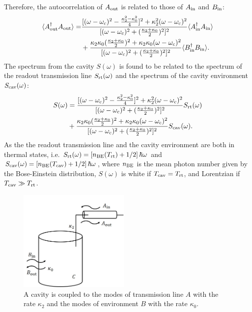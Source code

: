 
Therefore, the autocorrelation of $A_{\rm out}$ is related to those of $A_{\rm in}$ and $B_{\rm in}$:
\begin{equation}
\label{eq:autocorrelation}
\begin{split}
    \langle A_{\rm out}^\dagger A_{\rm out} \rangle  = & \frac{[(\omega-\omega_{\rm c})^2 - \frac{\kappa_2^2-\kappa_0^2}{4}]^2+\kappa_2^2(\omega-\omega_{\rm c})^2}{[(\omega-\omega_{\rm c})^2+(\frac{\kappa_2+\kappa_0}{2})^2]^2} \langle A_{\rm in}^\dagger A_{\rm in} \rangle \\ & +  \frac{\kappa_2\kappa_0(\frac{\kappa_2+\kappa_0}{2})^2+\kappa_2\kappa_0(\omega-\omega_{\rm c})^2}{[(\omega-\omega_{\rm c})^2+(\frac{\kappa_2+\kappa_0}{2})^2]^2}\langle B_{\rm in}^\dagger B_{\rm in} \rangle.
\end{split}
\end{equation}
The spectrum from the cavity $S(\omega)$ is found to be related to the spectrum 
of the readout transmission line $S_{\rm rt}(\omega)$ and the spectrum of the 
cavity environment $S_{\rm cav}(\omega)$:
\begin{equation}
\label{eq:spectrum_relation}
\begin{split}
    S(\omega) & = \frac{[(\omega-\omega_{\rm c})^2 - \frac{\kappa_2^2-\kappa_0^2}{4}]^2+\kappa_2^2(\omega-\omega_{\rm c})^2}{[(\omega-\omega_{\rm c})^2+(\frac{\kappa_2+\kappa_0}{2})^2]^2} S_{\rm rt}(\omega) \\ & + \frac{\kappa_2\kappa_0(\frac{\kappa_2+\kappa_0}{2})^2+\kappa_2\kappa_0(\omega-\omega_{\rm c})^2}{[(\omega-\omega_{\rm c})^2+(\frac{\kappa_2+\kappa_0}{2})^2]^2}S_{\rm cav}(\omega).
\end{split}
\end{equation}
As the the readout transmission line and the cavity environment are both in 
thermal states, i.e. $S_{\rm rt}(\omega)=\left[n_{\rm BE}(T_{\rm rt})+1/2\right]\hbar\omega$ 
and $S_{\rm cav}(\omega)=\left[n_{\rm BE}(T_{\rm cav})+1/2\right]\hbar\omega$, where 
$n_{\rm BE}$ is the mean photon number given by the Bose-Einstein distribution, 
$S(\omega)$ is white if $T_{\rm cav}=T_{\rm rt}$, and Lorentzian if 
$T_{\rm cav} \gg T_{\rm rt}$.

\begin{figure}[htbp]
    \centering
    \includegraphics[width=0.48\textwidth]{figures/cavity_in_out.jpg}
    \caption{A cavity is coupled to the modes of transmission line $A$ with the 
rate $\kappa_2$ and the modes of environment $B$ with the rate $\kappa_0$.}
    \label{fig:cavity_in_out.jpg}
\end{figure}


